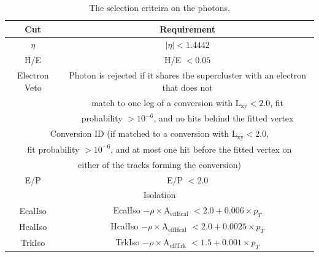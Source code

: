 \begin{table}[!ht]
\begin{center}
\begin{tabular}{|c|c|} 
\hline
Cut           & Requirement                                                                           \\
\hline
$\eta$        & $|\eta| < 1.4442$                                                                     \\ 
\hline
H/E           & H/E $< 0.05$                                                                          \\
\hline
Electron Veto & Photon is rejected if it shares the supercluster with an electron that does not       \\
              & match to one leg of a conversion with $\mathrm{L}_{\mathrm{xy}} < 2.0$, fit           \\
              & probability  $> 10^{-6}$, and no hits behind the fitted vertex                        \\
\hline
\hline
\multicolumn{2}{|c|}{Conversion ID (if matched to a conversion with $\mathrm{L}_{\mathrm{xy}} < 2.0$,}\\
\multicolumn{2}{|c|}{fit probability $> 10^{-6}$, and at most one hit before the fitted vertex on }   \\
\multicolumn{2}{|c|}{either of the tracks forming the conversion) }                                   \\
\hline
E/P            & E/P $< 2.0 $                                                                         \\
\hline
\hline
\multicolumn{2}{|c|}{Isolation}                                                                       \\
\hline
EcalIso       & EcalIso $ - \rho\times \mathrm{A}_{\mathrm{eff Ecal}}$ $<  2.0 + 0.006\times p_{T}$   \\
HcalIso       & HcalIso $ - \rho\times \mathrm{A}_{\mathrm{eff Hcal}}$ $<  2.0 + 0.0025\times p_{T}$  \\
TrkIso        & TrkIso $ - \rho\times \mathrm{A}_{\mathrm{eff Trk}}$ $<  1.5 + 0.001\times p_{T}$     \\
\hline


\hline
\end{tabular}
\caption{The selection criteira on the photons.
\label{tab:PhotonSelection}}
\end{center}
\end{table}

